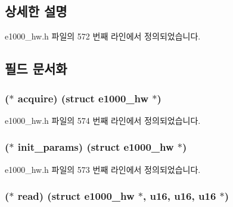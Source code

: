 \subsection{상세한 설명}


e1000\+\_\+hw.\+h 파일의 572 번째 라인에서 정의되었습니다.



\subsection{필드 문서화}
\subsubsection[{\texorpdfstring{acquire}{acquire}}]{($\ast$ acquire) (struct {\bf e1000\+\_\+hw} $\ast$)}\hypertarget{structe1000__nvm__operations_a8509a9e3db6050cb00cecc1a855a70ed}{}\label{structe1000__nvm__operations_a8509a9e3db6050cb00cecc1a855a70ed}


e1000\+\_\+hw.\+h 파일의 574 번째 라인에서 정의되었습니다.

\subsubsection[{\texorpdfstring{init\+\_\+params}{init_params}}]{($\ast$ init\+\_\+params) (struct {\bf e1000\+\_\+hw} $\ast$)}\hypertarget{structe1000__nvm__operations_a9697a81cd453237323e05ff88409b12e}{}\label{structe1000__nvm__operations_a9697a81cd453237323e05ff88409b12e}


e1000\+\_\+hw.\+h 파일의 573 번째 라인에서 정의되었습니다.

\subsubsection[{\texorpdfstring{read}{read}}]{($\ast$ read) (struct {\bf e1000\+\_\+hw} $\ast$, {\bf u16}, {\bf u16}, {\bf u16} $\ast$)}\hypertarget{structe1000__nvm__operations_a9941dbe5edf45a3e1dc201339ebe8855}{}\label{structe1000__nvm__operations_a9941dbe5edf45a3e1dc201339ebe8855}


